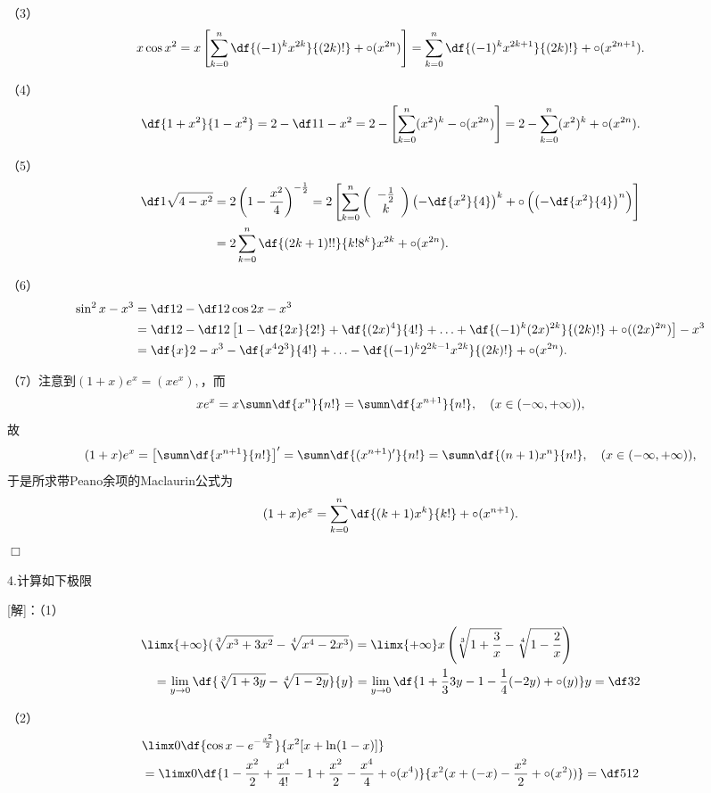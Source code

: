 （3）
$$
	x\cos x^2
	=x\left[\sum\limits_{k=0}^n\df{(-1)^kx^{2k}}{(2k)!}
	+\circ(x^{2n})\right]
	=\sum\limits_{k=0}^n\df{(-1)^kx^{2k+1}}{(2k)!}
	+\circ(x^{2n+1}).
$$

（4）
$$
	\df{1+x^2}{1-x^2}
	=2-\df1{1-x^2}
	=2-\left[\sum\limits_{k=0}^n(x^2)^k-\circ(x^{2n})\right]
	=2-\sum\limits_{k=0}^n(x^2)^k+\circ(x^{2n}).
$$

（5）
\begin{align*}
	\df1{\sqrt{4-x^2}}
	&=2\left(1-\frac{x^2}4\right)^{-\frac12}
	=2\left[\sum\limits_{k=0}^n\left(\begin{array}{c}
		-\frac12 \\ k
	\end{array}\right)\left(-\df{x^2}{4}\right)^k
	+\circ\left(\left(-\df{x^2}{4}\right)^n\right)
	\right]\\
	&=2\sum\limits_{k=0}^n\df{(2k+1)!!}{k!8^k}x^{2k}
	+\circ(x^{2n}).
\end{align*}

（6）
\begin{align*}
	\sin^2x-x^3&=\df12-\df12\cos2x-x^3\\
	&=\df12-\df12\left[1-\df{2x}{2!}+\df{(2x)^4}{4!}
	+\ldots+\df{(-1)^k(2x)^{2k}}{(2k)!}+\circ((2x)^{2n})\right]-x^3\\
	&=\df{x}2-x^3-\df{x^42^3}{4!}
	+\ldots-\df{(-1)^k2^{2k-1}x^{2k}}{(2k)!}+\circ(x^{2n}).
\end{align*}

（7）注意到$(1+x)e^x=(xe^x),$，而
$$xe^x=x\sumn\df{x^n}{n!}=\sumn\df{x^{n+1}}{n!},
\quad(x\in(-\infty,+\infty)),$$
故
$$(1+x)e^x=\left[\sumn\df{x^{n+1}}{n!}\right]'
=\sumn\df{(x^{n+1})'}{n!}
=\sumn\df{(n+1)x^n}{n!},
\quad(x\in(-\infty,+\infty)),$$
于是所求带Peano余项的Maclaurin公式为
$$(1+x)e^x=\sum\limits_{k=0}^n\df{(k+1)x^k}{k!}+\circ(x^{n+1}).$$
\hfill$\Box$

\bigskip

4.计算如下极限

[解]：（1）
\begin{align*}
	&\limx{+\infty}(\sqrt[3]{x^3+3x^2}-\sqrt[4]{x^4-2x^3})
	=\limx{+\infty}x\left(\sqrt[3]{1+\frac3x}
	-\sqrt[4]{1-\frac2x}\right)\\
	&\quad =\lim\limits_{y\to0}\df{\sqrt[3]{1+3y}
	-\sqrt[4]{1-2y}}{y}
	=\lim\limits_{y\to0}\df{1+\frac133y-1-\frac14(-2y)+\circ(y)}y=\df32
\end{align*}

（2）
\begin{align*}
	&\limx0\df{\cos x-e^{-\frac{x^2}2}}{x^2[x+\ln(1-x)]}\\
	&=\limx0\df{1-\frac{x^2}2+\frac{x^4}{4!}-1+\frac{x^2}2
	-\frac{x^4}{4}+\circ(x^4)}{x^2(x+(-x)-\frac{x^2}2+\circ(x^2))}
	=\df5{12}
\end{align*}

